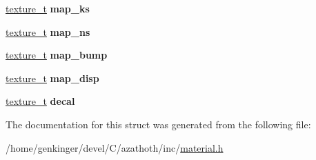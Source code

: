 \begin{DoxyCompactItemize}
\mbox{\label{structmaterial__t_ac7cf9f0c9df16be3976f687f6b623522}} 
\mbox{\hyperlink{structtexture__t}{texture\+\_\+t}} {\bfseries map\+\_\+ks}
\item 
\mbox{\label{structmaterial__t_a221281df36aae111e22cc221651fe7ac}} 
\mbox{\hyperlink{structtexture__t}{texture\+\_\+t}} {\bfseries map\+\_\+ns}
\item 
\mbox{\label{structmaterial__t_a08e50723c14c438f1e5d3ccd993520cc}} 
\mbox{\hyperlink{structtexture__t}{texture\+\_\+t}} {\bfseries map\+\_\+bump}
\item 
\mbox{\label{structmaterial__t_ab17d900fb4e993b71003475a524b2fc4}} 
\mbox{\hyperlink{structtexture__t}{texture\+\_\+t}} {\bfseries map\+\_\+disp}
\item 
\mbox{\label{structmaterial__t_ab512861659fe64db3e398c12c7d4409d}} 
\mbox{\hyperlink{structtexture__t}{texture\+\_\+t}} {\bfseries decal}
\end{DoxyCompactItemize}


The documentation for this struct was generated from the following file\+:\begin{DoxyCompactItemize}
\item 
/home/genkinger/devel/\+C/azathoth/inc/\mbox{\hyperlink{material_8h}{material.\+h}}\end{DoxyCompactItemize}
